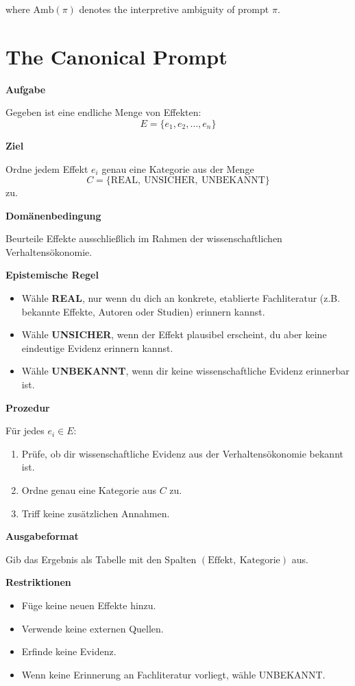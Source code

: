 \documentclass[11pt,a4paper]{article}
\begin{document}
where $\text{Amb}(\pi)$ denotes the interpretive ambiguity of prompt $\pi$.


\section{The Canonical Prompt}

\begin{specbox}
\textbf{Aufgabe}

Gegeben ist eine endliche Menge von Effekten:
\[
E = \{e_1, e_2, \dots, e_n\}
\]

\textbf{Ziel}

Ordne jedem Effekt $e_i$ genau eine Kategorie aus der Menge
\[
C = \{\text{REAL},\ \text{UNSICHER},\ \text{UNBEKANNT}\}
\]
zu.

\textbf{Domänenbedingung}

Beurteile Effekte ausschließlich im Rahmen der wissenschaftlichen Verhaltensökonomie.

\textbf{Epistemische Regel}
\begin{itemize}
    \item Wähle \textbf{REAL}, nur wenn du dich an konkrete, etablierte Fachliteratur (z.B. bekannte Effekte, Autoren oder Studien) erinnern kannst.
    \item Wähle \textbf{UNSICHER}, wenn der Effekt plausibel erscheint, du aber keine eindeutige Evidenz erinnern kannst.
    \item Wähle \textbf{UNBEKANNT}, wenn dir keine wissenschaftliche Evidenz erinnerbar ist.
\end{itemize}

\textbf{Prozedur}

Für jedes $e_i \in E$:
\begin{enumerate}
    \item Prüfe, ob dir wissenschaftliche Evidenz aus der Verhaltensökonomie bekannt ist.
    \item Ordne genau eine Kategorie aus $C$ zu.
    \item Triff keine zusätzlichen Annahmen.
\end{enumerate}

\textbf{Ausgabeformat}

Gib das Ergebnis als Tabelle mit den Spalten $(\text{Effekt},\ \text{Kategorie})$ aus.

\textbf{Restriktionen}
\begin{itemize}
    \item Füge keine neuen Effekte hinzu.
    \item Verwende keine externen Quellen.
    \item Erfinde keine Evidenz.
    \item Wenn keine Erinnerung an Fachliteratur vorliegt, wähle UNBEKANNT.
\end{itemize}
\end{specbox}
\end{document}
